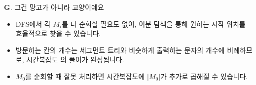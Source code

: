 \begin{frame}{\textbf{G}. 그건 망고가 아니라 고양이예요}
    \begin{itemize}
        \item DFS에서 각 $M_i$를 다 순회할 필요도 없이, 이분 탐색을 통해 원하는 시작 위치를 효율적으로 찾을 수 있습니다.
        \item 방문하는 칸의 개수는 세그먼트 트리와 비슷하게 출력하는 문자의 개수에 비례하므로, 시간복잡도 의 풀이가 완성됩니다.
        \item $M_0$를 순회할 때 잘못 처리하면 시간복잡도에 $\vert M_0 \vert$가 추가로 곱해질 수 있습니다.
    \end{itemize}
\end{frame}